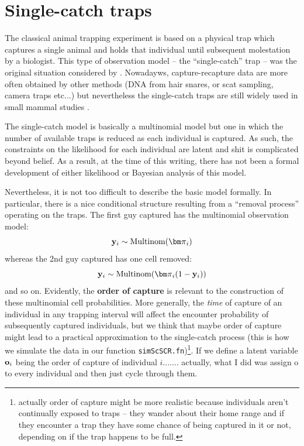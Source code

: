 \section{Single-catch traps}
\label{poisson-mn.sec.singlecatch}

The classical animal trapping experiment is based on a physical trap
which captures a single animal and holds that individual until
subsequent molestation by a biologist. 
This type of observation model -- the ``single-catch'' trap -- 
was the original situation considered by
\citet{efford:2004}. Nowadayws, capture-recapture data are more often
obtained by other methods (DNA from hair snares, or scat sampling,
camera traps etc...) but nevertheless the single-catch traps are still
widely used in small mammal studies \citep{converse_1996,
  converse_royle:2012, converse_royle:2013}.

The single-catch model is basically a multinomial model but one in
which the number of available traps is reduced as each individual is
captured. As such, the constraints on the likelihood for each
individual are latent and shit is complicated beyond belief.  As a
result, at the time of this writing, there has not been a formal
development of either likelihood or Bayesian analysis of this model.

Nevertheless, it is not too difficult to describe the basic model
formally. In particular, there is a nice conditional structure
resulting from a ``removal process'' operating on the traps.  The
first guy captured has the multinomial observation model:
\[
{\bf y}_{i} \sim \mbox{Multinom}({\bm \pi}_{i})
\]
whereas the 2nd guy captured has one cell removed:
\[
{\bf y}_{i} \sim \mbox{Multinom}({\bm \pi}_{i}(1-{\bf y}_{i})    )
\]
and so on.  Evidently, the {\bf order of capture} is relevant to the
construction of these multinomial cell probabilities. More generally,
the {\it time} of capture of an individual in any trapping interval
will affect the encounter probability of subsequently captured
individuals, but we think that maybe order of capture might lead to a
practical approximation to the single-catch process (this is how we
simulate the data in our function \mbox{\tt simScSCR.fn})\footnote{actually order of
  capture might be more realistic because individuals aren't
  continually exposed to traps -- they wander about their home range
  and if they encounter a trap they have some chance of being captured
  in it or not, depending on if the trap happens to be full. }.  If we
define a latent variable ${\bf o}_{i}$ being the order of capture of
individual $i$....... actually, what I did was assign o to every
individual and then just cycle through them. 


